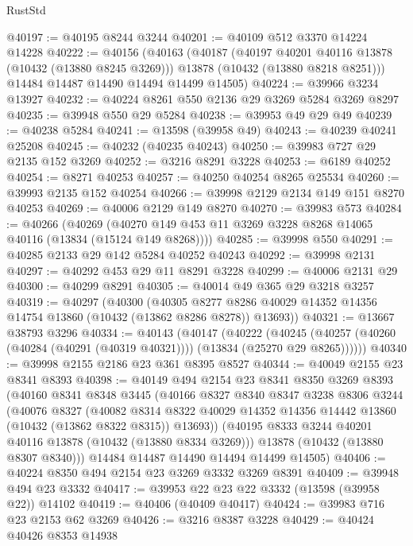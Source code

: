 \begin{lexlean}{RustStd}
\begin{coremodule}
@40197 := @40195 @8244 @3244
@40201 := @40109 @512 @3370 @14224 @14228
@40222 := @40156
    (@40163
      (@40187
        (@40197 @40201 @40116 @13878 (@10432 (@13880 @8245 @3269)))
        @13878
        (@10432 (@13880 @8218 @8251)))
      @14484
      @14487
      @14490
      @14494
      @14499
      @14505)
@40224 := @39966 @3234 @13927
@40232 := @40224 @8261 @550 @2136 @29 @3269 @5284 @3269 @8297
@40235 := @39948 @550 @29 @5284
@40238 := @39953 @49 @29 @49
@40239 := @40238 @5284
@40241 := @13598 (@39958 @49)
@40243 := @40239 @40241 @25208
@40245 := @40232 (@40235 @40243)
@40250 := @39983 @727 @29 @2135 @152 @3269
@40252 := @3216 @8291 @3228
@40253 := @6189 @40252
@40254 := @8271 @40253
@40257 := @40250 @40254 @8265 @25534
@40260 := @39993 @2135 @152 @40254
@40266 := @39998 @2129 @2134 @149 @151 @8270 @40253
@40269 := @40006 @2129 @149 @8270
@40270 := @39983 @573
@40284 := @40266
    (@40269 (@40270 @149 @453 @11 @3269 @3228 @8268 @14065 @40116 (@13834 (@15124 @149 @8268))))
@40285 := @39998 @550
@40291 := @40285 @2133 @29 @142 @5284 @40252 @40243
@40292 := @39998 @2131
@40297 := @40292 @453 @29 @11 @8291 @3228
@40299 := @40006 @2131 @29
@40300 := @40299 @8291
@40305 := @40014 @49 @365 @29 @3218 @3257
@40319 := @40297
    (@40300
      (@40305 @8277 @8286 @40029 @14352 @14356 @14754 @13860 (@10432 (@13862 @8286 @8278)) @13693))
@40321 := @13667 @38793 @3296
@40334 := @40143
    (@40147
      (@40222
        (@40245 (@40257 (@40260 (@40284 (@40291 (@40319 @40321)))) (@13834 (@25270 @29 @8265))))))
@40340 := @39998 @2155 @2186 @23 @361 @8395 @8527
@40344 := @40049 @2155 @23 @8341 @8393
@40398 := @40149
    @494
    @2154
    @23
    @8341
    @8350
    @3269
    @8393
    (@40160
      @8341
      @8348
      @3445
      (@40166
        @8327
        @8340
        @8347
        @3238
        @8306
        @3244
        (@40076
          @8327
          (@40082
            @8314
            @8322
            @40029
            @14352
            @14356
            @14442
            @13860
            (@10432 (@13862 @8322 @8315))
            @13693))
        (@40195 @8333 @3244 @40201 @40116 @13878 (@10432 (@13880 @8334 @3269)))
        @13878
        (@10432 (@13880 @8307 @8340)))
      @14484
      @14487
      @14490
      @14494
      @14499
      @14505)
@40406 := @40224 @8350 @494 @2154 @23 @3269 @3332 @3269 @8391
@40409 := @39948 @494 @23 @3332
@40417 := @39953 @22 @23 @22 @3332 (@13598 (@39958 @22)) @14102
@40419 := @40406 (@40409 @40417)
@40424 := @39983 @716 @23 @2153 @62 @3269
@40426 := @3216 @8387 @3228
@40429 := @40424 @40426 @8353 @14938

\end{coremodule}
\end{lexlean}

